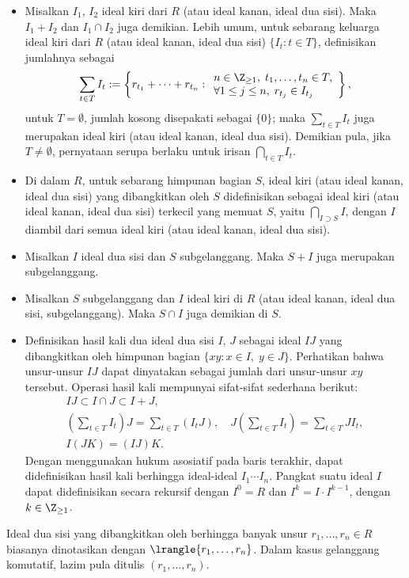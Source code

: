 \begin{itemize}
	\item Misalkan $I_1$, $I_2$ ideal kiri dari $R$ (atau ideal kanan, ideal dua sisi). Maka $I_1 + I_2$ dan $I_1 \cap I_2$ juga demikian. Lebih umum, untuk sebarang keluarga ideal kiri dari $R$ (atau ideal kanan, ideal dua sisi) $\{ I_t: t \in T \}$, definisikan jumlahnya sebagai
		\[ \sum_{t \in T} I_t := \left\{ r_{t_1} + \cdots + r_{t_n} :
		\begin{array}{l}
			n \in \Z_{\geq 1}, \; t_1, \ldots, t_n \in T, \\
			\forall 1 \leq j \leq n, \; r_{t_j} \in I_{t_j}
		\end{array} \right\}, \]
		untuk $T = \emptyset$, jumlah kosong disepakati sebagai $\{0\}$; maka $\sum_{t \in T} I_t$ juga merupakan ideal kiri (atau ideal kanan, ideal dua sisi). Demikian pula, jika $T \neq \emptyset$, pernyataan serupa berlaku untuk irisan $\bigcap_{t \in T} I_t$.
	\item Di dalam $R$, untuk sebarang himpunan bagian $S$, ideal kiri (atau ideal kanan, ideal dua sisi) yang dibangkitkan oleh $S$ didefinisikan sebagai ideal kiri (atau ideal kanan, ideal dua sisi) terkecil yang memuat $S$, yaitu $\bigcap_{I \supset S} I$, dengan $I$ diambil dari semua ideal kiri (atau ideal kanan, ideal dua sisi).
	\item Misalkan $I$ ideal dua sisi dan $S$ subgelanggang. Maka $S+I$ juga merupakan subgelanggang.
	\item Misalkan $S$ subgelanggang dan $I$ ideal kiri di $R$ (atau ideal kanan, ideal dua sisi, subgelanggang). Maka $S \cap I$ juga demikian di $S$.
	\item Definisikan hasil kali dua ideal dua sisi $I$, $J$ sebagai ideal $IJ$ yang dibangkitkan oleh himpunan bagian $\{xy : x \in I,\; y \in J\}$. Perhatikan bahwa unsur-unsur $IJ$ dapat dinyatakan sebagai jumlah dari unsur-unsur $xy$ tersebut. Operasi hasil kali mempunyai sifat-sifat sederhana berikut:
		\begin{gather*}
			IJ \subset I \cap J \subset I+J, \\
			(\sum_{t \in T} I_t) J = \sum_{t \in T} (I_t J), \quad J(\sum_{t \in T} I_t) = \sum_{t \in T} J I_t, \\
			I(JK) = (IJ)K.
		\end{gather*}
		Dengan menggunakan hukum asosiatif pada baris terakhir, dapat didefinisikan hasil kali berhingga ideal-ideal $I_1 \cdots I_n$. Pangkat suatu ideal $I$ dapat didefinisikan secara rekursif dengan $I^0 = R$ dan $I^k = I \cdot I^{k-1}$, dengan $k \in \Z_{\geq 1}$.
\end{itemize}
Ideal dua sisi yang dibangkitkan oleh berhingga banyak unsur $r_1, \ldots, r_n \in R$ biasanya dinotasikan dengan $\lrangle{r_1, \ldots, r_n}$. Dalam kasus gelanggang komutatif, lazim pula ditulis $(r_1, \ldots, r_n)$.


